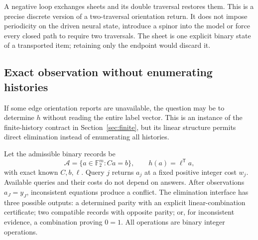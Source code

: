 \documentclass[11pt,a4paper]{article}
\theoremstyle{definition}\newtheorem{definition}[theorem]{Definition}
\begin{document}
A negative loop exchanges sheets and its double traversal restores them. This is a precise discrete version of a two-traversal orientation return. It does not impose periodicity on the driven neural state, introduce a spinor into the model or force every closed path to require two traversals. The sheet is one explicit binary state of a transported item; retaining only the endpoint would discard it.

\subsection{Exact observation without enumerating histories}\label{sec:binaryobservation}
If some edge orientation reports are unavailable, the question may be to determine $h$ without reading the entire label vector. This is an instance of the finite-history contract in Section~\ref{sec:finite}, but its linear structure permits direct elimination instead of enumerating all histories.

Let the admissible binary records be
\begin{equation}
 \mathcal A=\{a\in\mathbb F_2^m:Ca=b\},
 \qquad h(a)=\ell^{\mathsf T}a,
 \label{eq:binarymodel}
\end{equation}
with exact known $C,b,\ell$. Query $j$ returns $a_j$ at a fixed positive integer cost $w_j$. Available queries and their costs do not depend on answers. After observations $a_J=y_J$, inconsistent equations produce a conflict. The elimination interface has three possible outputs: a determined parity with an explicit linear-combination certificate; two compatible records with opposite parity; or, for inconsistent evidence, a combination proving $0=1$. All operations are binary integer operations.
\end{document}
